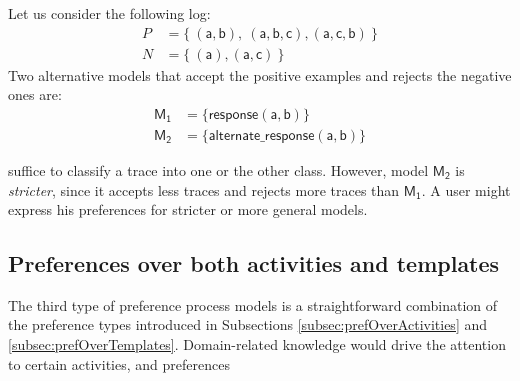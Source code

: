\begin{example}
\label{ex:alternateVsResponse}
Let us consider the following log:
\begin{align*}
P & = \{\ (\mathsf{a}, \mathsf{b}),\ (\mathsf{a}, \mathsf{b}, \mathsf{c}),(\mathsf{a}, \mathsf{c}, \mathsf{b})\ \} \\
N & = \{\ (\mathsf{a}), (\mathsf{a}, \mathsf{c})\ \}
\end{align*}
%
Two alternative models that accept the positive examples and rejects the negative ones are:
\begin{align*}
\mathsf{M_1} & = \{ \mathsf{response(a,b)}\} \\
\mathsf{M_2} & = \{ \mathsf{alternate\_response(a, b)}\} \tag*{$\square$}
\end{align*}
\end{example}

suffice to classify a trace into one or the other class. However, model $\mathsf{M_2}$ is \emph{stricter}, since it accepts less traces and rejects more traces than $\mathsf{M_1}$. A user might express his preferences for stricter or more general models.


\subsection{Preferences over both activities and templates}
\label{sub:prefOverBoth}


The third type of preference  %
 process models is a straightforward combination of the preference types introduced in Subsections \ref{subsec:prefOverActivities} and \ref{subsec:prefOverTemplates}. Domain-related knowledge would drive the attention to certain activities, and preferences %


